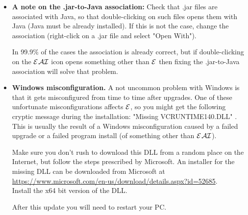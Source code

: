 \documentclass[11pt]{article}
\newcommand{\ERGO}{\mbox{\ensuremath{\cal{E}}\smaller{{\sc{RGO}}}}\xspace}
\newcommand{\ERGOAI}{\mbox{{\ensuremath{\cal{E}}\smaller{{\sc{RGO}}}}\ensuremath{\cal{AI}}}\xspace}
\begin{document}
\begin{itemize}
\begin{itemize}
    If you are using a Norton anti-virus product, right-click on the file
    and select 'File Insight' then 'Trust'
    the file.
  \item \textbf{A note on the .jar-to-Java association:} 
    Check that .jar files are
    associated with Java, so that double-clicking on such files opens them
    with Java (Java must be already installed). If this is not the case,
    change the association (right-click on a .jar file and select "Open
    With").

    In 99.9\% of the cases the association is already correct, but if
    double-clicking on the \ERGOAI icon opens something other than \ERGO then
    fixing the .jar-to-Java association will solve that problem.
  \item \textbf{Windows misconfiguration.}  A not uncommon problem with
    Windows is that it gets misconfigured from time to time after
    upgrades. One of these unfortunate misconfigurations affects \ERGO, so
    you might get the following cryptic message during the installation:
    "Missing VCRUNTIME140.DLL" .  This is usually the result of a Windows
    misconfiguration caused by a failed upgrade or a failed program install
    (of something other than \ERGOAI).

    Make sure you don't rush to download this DLL from a random place on
    the Internet, but follow the steps prescribed by Microsoft. An
    installer for the missing DLL can be downloaded from Microsoft at
    \\
    \url{https://www.microsoft.com/en-us/download/details.aspx?id=52685}.
    \\
    Install the x64 bit version of the DLL.

    After this update you will need to restart your PC.
  \end{itemize}


\end{itemize}
\end{document}
